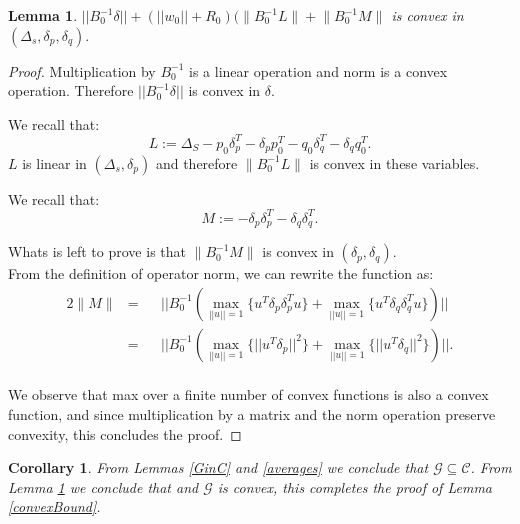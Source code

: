 \documentclass{vldb}
\newtheorem{lemma}{Lemma}
\newtheorem{corollary}{Corollary}
\begin{document}
\begin{appendix}
\begin{lemma} \label{GisConvex}
$||B_0^{-1}\delta|| + (||w_0||+R_0)(\Big \|B_0^{-1}L\Big \|+\Big \|B_0^{-1}M\Big \|$ is convex in $(\Delta_s,\delta_p, \delta_q).$
\end{lemma}
\begin{proof}
Multiplication by $B_0^{-1}$ is a linear operation and norm is a convex
operation. Therefore $||B_0^{-1}\delta||$ is convex in $\delta$.

We recall that:
\begin{equation*}
L:= \Delta_S - p_0\delta_p^T - \delta_pp_0^T - q_0\delta_q^T - \delta_qq_0^T.
\end{equation*}
$L$ is linear in $(\Delta_s, \delta_p)$ and therefore $\Big \|B_0^{-1}L\Big \|$ is convex in these variables.


We recall that:
\begin{equation*}
M:= - \delta_p\delta_p^T - \delta_q\delta_q^T.
\end{equation*}

Whats is left to prove is that $\Big \|B_0^{-1}M\Big \|$ is convex in $(\delta_p, \delta_q)$.
\\From the definition of operator norm, we can rewrite the function as:
\begin{alignat*} {2}
\Big \|M \Big \| & = && ||B_0^{-1}(\max_{||u||=1}{\{u^T \delta_p\delta_p^T u\}} +
\max_{||u||=1}{\{u^T \delta_q\delta_q^T u\}})||\\
& = && ||B_0^{-1}(\max_{||u||=1}{\{||u^T \delta_p||^2\}} +
\max_{||u||=1}{\{||u^T \delta_q||^2\}})||.
\end{alignat*}
\\We observe that max over a finite number of convex functions is also a convex
function, and since multiplication by a matrix and the norm
operation preserve convexity, this concludes the proof.
\end{proof}

\begin{corollary}
From Lemmas \ref{GinC} and \ref{averages} we conclude that $\mathcal{G}\subseteq \mathcal{C}$. From Lemma \ref{GisConvex} we conclude that and $\mathcal{G}$ is convex, this completes the proof of Lemma \ref{convexBound}.
\end{corollary}
\end{appendix}
\end{document}
